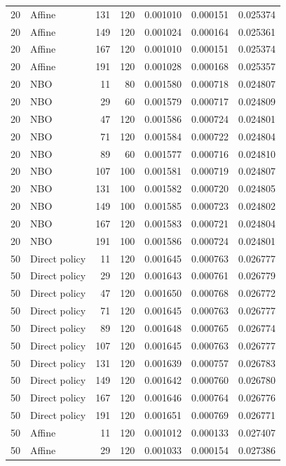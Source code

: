{\begin{longtable}{rlrrrrr}
20 & Affine & 131 & 120 & 0.001010 & 0.000151 & 0.025374 \\
20 & Affine & 149 & 120 & 0.001024 & 0.000164 & 0.025361 \\
20 & Affine & 167 & 120 & 0.001010 & 0.000151 & 0.025374 \\
20 & Affine & 191 & 120 & 0.001028 & 0.000168 & 0.025357 \\
20 & NBO & 11 & 80 & 0.001580 & 0.000718 & 0.024807 \\
20 & NBO & 29 & 60 & 0.001579 & 0.000717 & 0.024809 \\
20 & NBO & 47 & 120 & 0.001586 & 0.000724 & 0.024801 \\
20 & NBO & 71 & 120 & 0.001584 & 0.000722 & 0.024804 \\
20 & NBO & 89 & 60 & 0.001577 & 0.000716 & 0.024810 \\
20 & NBO & 107 & 100 & 0.001581 & 0.000719 & 0.024807 \\
20 & NBO & 131 & 100 & 0.001582 & 0.000720 & 0.024805 \\
20 & NBO & 149 & 100 & 0.001585 & 0.000723 & 0.024802 \\
20 & NBO & 167 & 120 & 0.001583 & 0.000721 & 0.024804 \\
20 & NBO & 191 & 100 & 0.001586 & 0.000724 & 0.024801 \\
50 & Direct policy & 11 & 120 & 0.001645 & 0.000763 & 0.026777 \\
50 & Direct policy & 29 & 120 & 0.001643 & 0.000761 & 0.026779 \\
50 & Direct policy & 47 & 120 & 0.001650 & 0.000768 & 0.026772 \\
50 & Direct policy & 71 & 120 & 0.001645 & 0.000763 & 0.026777 \\
50 & Direct policy & 89 & 120 & 0.001648 & 0.000765 & 0.026774 \\
50 & Direct policy & 107 & 120 & 0.001645 & 0.000763 & 0.026777 \\
50 & Direct policy & 131 & 120 & 0.001639 & 0.000757 & 0.026783 \\
50 & Direct policy & 149 & 120 & 0.001642 & 0.000760 & 0.026780 \\
50 & Direct policy & 167 & 120 & 0.001646 & 0.000764 & 0.026776 \\
50 & Direct policy & 191 & 120 & 0.001651 & 0.000769 & 0.026771 \\
50 & Affine & 11 & 120 & 0.001012 & 0.000133 & 0.027407 \\
50 & Affine & 29 & 120 & 0.001033 & 0.000154 & 0.027386 \\

\end{longtable}}
